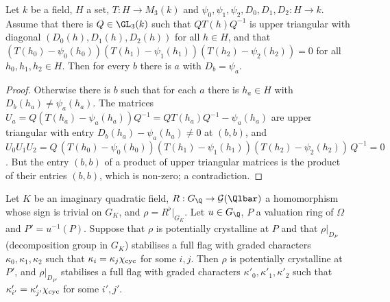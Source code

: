 \begin{lemma}\label{pf:modularity:flagmatch}
Let $k$ be a field, $H$ a set, $T:H\to M_3(k)$ and $\psi_0,\psi_1,\psi_2,D_0,D_1,D_2:H\to k$. Assume that there is
$Q\in\GL_3(k)$ such that $QT(h)Q^{-1}$ is upper triangular with diagonal $(D_0(h),D_1(h),D_2(h))$ for all $h\in H$, and
that $(T(h_0)-\psi_0(h_0))(T(h_1)-\psi_1(h_1))(T(h_2)-\psi_2(h_2))=0$ for all $h_0,h_1,h_2\in H$. Then for every $b$
there is $a$ with $D_b=\psi_a$.
\end{lemma}

\begin{proof}
Otherwise there is $b$ such that for each $a$ there is $h_a\in H$ with $D_b(h_a)\ne\psi_a(h_a)$. The matrices
$U_a=Q(T(h_a)-\psi_a(h_a))Q^{-1}=QT(h_a)Q^{-1}-\psi_a(h_a)$ are upper triangular with entry $D_b(h_a)-\psi_a(h_a)\ne0$ at
$(b,b)$, and $U_0U_1U_2=Q\,(T(h_0)-\psi_0(h_0))(T(h_1)-\psi_1(h_1))(T(h_2)-\psi_2(h_2))\,Q^{-1}=0$. But the entry $(b,b)$
of a product of upper triangular matrices is the product of their entries $(b,b)$, which is non-zero; a contradiction.
\end{proof}

\begin{lemma}\label{pf:modularity:move}
Let $K$ be an imaginary quadratic field, $R:G_\Q\to\modularityG(\Qlbar)$ a homomorphism whose sign is trivial on $G_K$,
and $\rho=R^\flat|_{G_K}$. Let $u\in G_\Q$, $P$ a valuation ring of $\Omega$ and $P'=u^{-1}(P)$. Suppose that $\rho$ is
potentially crystalline at $P$ and that $\rho|_{D_P}$ (decomposition group in $G_K$) stabilises a full flag with graded
characters $\kappa_0,\kappa_1,\kappa_2$ such that $\kappa_i=\kappa_j\chi_{\mathrm{cyc}}$ for some $i,j$. Then $\rho$ is
potentially crystalline at $P'$, and $\rho|_{D_{P'}}$ stabilises a full flag with graded characters
$\kappa'_0,\kappa'_1,\kappa'_2$ such that $\kappa'_{i'}=\kappa'_{j'}\chi_{\mathrm{cyc}}$ for some $i',j'$.
\end{lemma}

